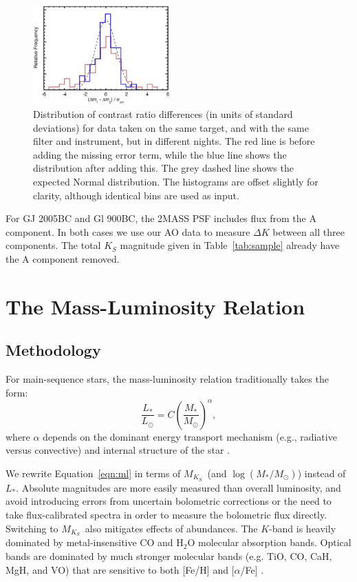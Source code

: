 \documentclass[twocolumn]{aastex62}
\newcommand{\mks}{$M_{K_S}$}
\begin{document}
\begin{figure}[htb]
\begin{center}
\includegraphics[width=0.47\textwidth]{errors.eps}
\caption{Distribution of contrast ratio differences (in units of standard deviations) for data taken on the same target, and with the same filter and instrument, but in different nights. The red line is before adding the missing error term, while the blue line shows the distribution after adding this. The grey dashed line shows the expected Normal distribution. The histograms are offset slightly for clarity, although identical bins are used as input.}
\label{fig:magnitudes}
\end{center}
\end{figure}

For GJ 2005BC and Gl 900BC, the 2MASS PSF includes flux from the A component. In both cases we use our AO data to measure $\Delta K$ between all three components. The total $K_S$ magnitude given in Table~\ref{tab:sample} already have the A component removed. 

\section{The Mass-Luminosity Relation}\label{sec:relation}

\subsection{Methodology}

For main-sequence stars, the mass-luminosity relation traditionally takes the form:
\begin{equation}\label{eqn:ml}
\frac{L_*}{L_\odot} = C \left(\frac{M_*}{M_\odot}\right)^\alpha,
\end{equation}
where $\alpha$ depends on the dominant energy transport mechanism (e.g., radiative versus convective) and internal structure of the star \citep{2004sipp.book.....H}. 

We rewrite Equation~\ref{eqn:ml} in terms of \mks\ (and $\log(M_*/M_\odot)$) instead of $L_*$. Absolute magnitudes are more easily measured than overall luminosity, and avoid introducing errors from uncertain bolometric corrections or the need to take flux-calibrated spectra in order to measure the bolometric flux directly. Switching to \mks\ also mitigates effects of abundances. The $K$-band is heavily dominated by metal-insensitive CO and H$_2$O molecular absorption bands. Optical bands are dominated by much stronger molecular bands (e.g. TiO, CO, CaH, MgH, and VO) that are sensitive to both [Fe/H] and [$\alpha$/Fe] \citep[Figure~\ref{fig:metal}, also see][]{Woolf:2006uq,Lepine:2007fk,Mann2013a}. 
\end{document}
